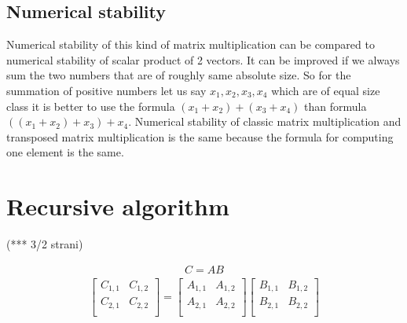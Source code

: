 \documentclass[a4paper,11pt]{article}
\begin{document}
\subsection{Numerical stability}
Numerical stability of this kind of matrix multiplication can be compared to numerical stability of scalar product of 2 vectors. 
It can be improved if we always sum the two numbers that are of roughly same absolute size. 
So for the summation of positive numbers let us say $x_{1},x_{2},x_{3},x_{4}$ which are of equal size class it is better to use the formula $(x_{1}+x_{2})+(x_{3}+x_{4})$ than formula $((x_{1}+x_{2})+x_{3})+x_{4}$.
Numerical stability of classic matrix multiplication and transposed matrix multiplication is the same because the formula for computing one element is the same.

\section{Recursive algorithm}
(*** 3/2 strani)

\begin{align*}
C=AB
\end{align*}
\begin{align*}
\begin{bmatrix}
C_{1,1} & C_{1,2} \\
C_{2,1} & C_{2,2} \\
\end{bmatrix}
=
\begin{bmatrix}
A_{1,1} & A_{1,2} \\
A_{2,1} & A_{2,2} \\
\end{bmatrix}
\begin{bmatrix}
B_{1,1} & B_{1,2} \\
B_{2,1} & B_{2,2} \\
\end{bmatrix}
\end{align*}
\end{document}
